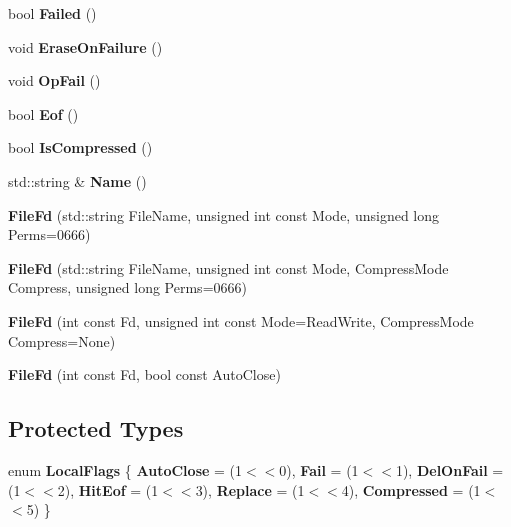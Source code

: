 \begin{DoxyCompactItemize}
\item 
bool {\bfseries \-Failed} ()\label{classFileFd_aa09ac85e9653ed2208a6365c36dd3e28}

\item 
void {\bfseries \-Erase\-On\-Failure} ()\label{classFileFd_a9df6dc5d9567d755018a22373a27315f}

\item 
void {\bfseries \-Op\-Fail} ()\label{classFileFd_a8808458007a65049c7d06dc97a957d13}

\item 
bool {\bfseries \-Eof} ()\label{classFileFd_ab44d5d527208dc2d4d7efd3e12277aa7}

\item 
bool {\bfseries \-Is\-Compressed} ()\label{classFileFd_a87d9479c04906ff821f1267f31487066}

\item 
std\-::string \& {\bfseries \-Name} ()\label{classFileFd_af92f87c82d1e15a9d059e27fab9fe0bf}

\item 
{\bfseries \-File\-Fd} (std\-::string \-File\-Name, unsigned int const \-Mode, unsigned long \-Perms=0666)\label{classFileFd_aa7bbbf2d42bd8654f92d87c41739ea47}

\item 
{\bfseries \-File\-Fd} (std\-::string \-File\-Name, unsigned int const \-Mode, \-Compress\-Mode \-Compress, unsigned long \-Perms=0666)\label{classFileFd_a43ae0eef5d1a5f30b03bb93f25b1ec64}

\item 
{\bfseries \-File\-Fd} (int const \-Fd, unsigned int const \-Mode=\-Read\-Write, \-Compress\-Mode \-Compress=\-None)\label{classFileFd_a26e246da293f081191c5bfd3e951ecbc}

\item 
{\bfseries \-File\-Fd} (int const \-Fd, bool const \-Auto\-Close)\label{classFileFd_ac88979222cd2d9bdbbfe9b44dfab0db0}

\end{DoxyCompactItemize}
\subsection*{\-Protected \-Types}
\begin{DoxyCompactItemize}
\item 
enum {\bfseries \-Local\-Flags} \{ \*
{\bfseries \-Auto\-Close} =  (1$<$$<$0), 
{\bfseries \-Fail} =  (1$<$$<$1), 
{\bfseries \-Del\-On\-Fail} =  (1$<$$<$2), 
{\bfseries \-Hit\-Eof} =  (1$<$$<$3), 
\*
{\bfseries \-Replace} =  (1$<$$<$4), 
{\bfseries \-Compressed} =  (1$<$$<$5)
 \}
\end{DoxyCompactItemize}
